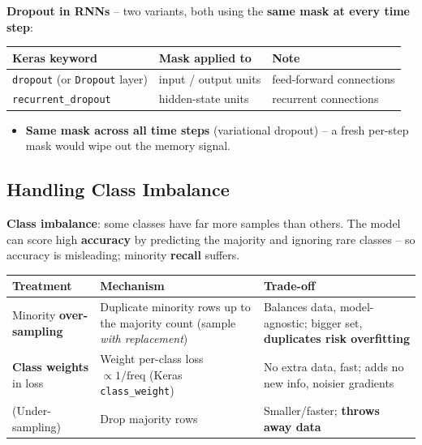 \documentclass[10pt,a4paper]{article}
\begin{document}
	\begin{definitionbox}
		\textbf{Dropout in RNNs} -- two variants, both using the \textbf{same mask at every time step}:
	\end{definitionbox}
	\begin{center}
		\begin{tabular}{@{}lll@{}}
			\toprule
			\textbf{Keras keyword} & \textbf{Mask applied to} & \textbf{Note} \\
			\midrule
			\texttt{dropout} (or \texttt{Dropout} layer) & input / output units & feed-forward connections \\
			\texttt{recurrent\_dropout} & hidden-state units & recurrent connections \\
			\bottomrule
		\end{tabular}
	\end{center}
	\begin{itemize}[leftmargin=*]
		\item \textbf{Same mask across all time steps} (variational dropout) -- a fresh per-step mask would wipe out the memory signal.
	\end{itemize}

	\subsection{Handling Class Imbalance}

	\begin{definitionbox}
		\textbf{Class imbalance}: some classes have far more samples than others. The model can score high \textbf{accuracy} by predicting the majority and ignoring rare classes -- so accuracy is misleading; minority \textbf{recall} suffers.
	\end{definitionbox}

	\begin{center}
		\begin{tabular}{@{}p{3.0cm}p{4.3cm}p{4.6cm}@{}}
			\toprule
			\textbf{Treatment} & \textbf{Mechanism} & \textbf{Trade-off} \\
			\midrule
			Minority \textbf{over-sampling} & Duplicate minority rows up to the majority count (sample \emph{with replacement}) & Balances data, model-agnostic; bigger set, \textbf{duplicates risk overfitting} \\
			\textbf{Class weights} in loss & Weight per-class loss $\propto 1/\text{freq}$ (Keras \texttt{class\_weight}) & No extra data, fast; adds no new info, noisier gradients \\
			(Under-sampling) & Drop majority rows & Smaller/faster; \textbf{throws away data} \\
			\bottomrule
		\end{tabular}
	\end{center}
\end{document}
